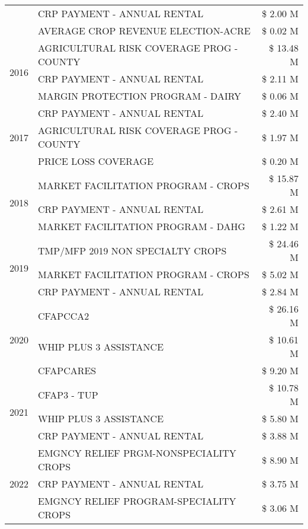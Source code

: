 \begin{tabular}{llr}
 & CRP PAYMENT - ANNUAL RENTAL & \$ 2.00 M \\
 & AVERAGE CROP REVENUE ELECTION-ACRE & \$ 0.02 M \\
\cline{1-3}
\multirow[t]{3}{*}{2016} & AGRICULTURAL RISK COVERAGE PROG - COUNTY & \$ 13.48 M \\
 & CRP PAYMENT - ANNUAL RENTAL & \$ 2.11 M \\
 & MARGIN PROTECTION PROGRAM - DAIRY & \$ 0.06 M \\
\cline{1-3}
\multirow[t]{3}{*}{2017} & CRP PAYMENT - ANNUAL RENTAL & \$ 2.40 M \\
 & AGRICULTURAL RISK COVERAGE PROG - COUNTY & \$ 1.97 M \\
 & PRICE LOSS COVERAGE & \$ 0.20 M \\
\cline{1-3}
\multirow[t]{3}{*}{2018} & MARKET FACILITATION PROGRAM - CROPS & \$ 15.87 M \\
 & CRP PAYMENT - ANNUAL RENTAL & \$ 2.61 M \\
 & MARKET FACILITATION PROGRAM - DAHG & \$ 1.22 M \\
\cline{1-3}
\multirow[t]{3}{*}{2019} & TMP/MFP 2019 NON SPECIALTY CROPS & \$ 24.46 M \\
 & MARKET FACILITATION PROGRAM - CROPS & \$ 5.02 M \\
 & CRP PAYMENT - ANNUAL RENTAL & \$ 2.84 M \\
\cline{1-3}
\multirow[t]{3}{*}{2020} & CFAPCCA2 & \$ 26.16 M \\
 & WHIP PLUS 3 ASSISTANCE & \$ 10.61 M \\
 & CFAPCARES & \$ 9.20 M \\
\cline{1-3}
\multirow[t]{3}{*}{2021} & CFAP3 - TUP & \$ 10.78 M \\
 & WHIP PLUS 3 ASSISTANCE & \$ 5.80 M \\
 & CRP PAYMENT - ANNUAL RENTAL & \$ 3.88 M \\
\cline{1-3}
\multirow[t]{3}{*}{2022} & EMGNCY RELIEF PRGM-NONSPECIALITY CROPS & \$ 8.90 M \\
 & CRP PAYMENT - ANNUAL RENTAL & \$ 3.75 M \\
 & EMGNCY RELIEF PROGRAM-SPECIALITY CROPS & \$ 3.06 M \\
\cline{1-3}
\bottomrule
\end{tabular}
